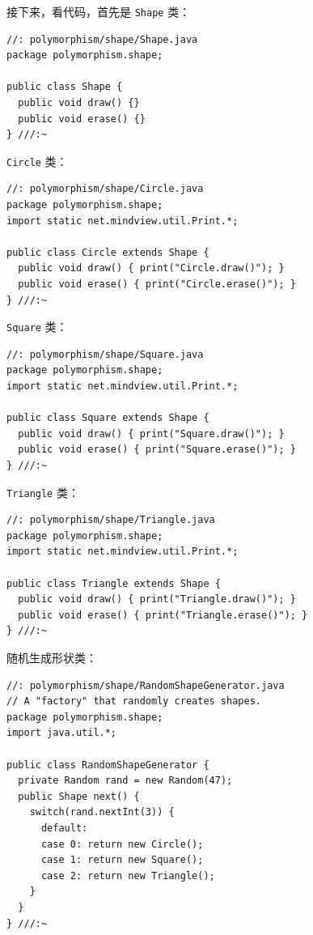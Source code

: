 \documentclass[10pt,a4paper,UTF8]{article}
\begin{document}
接下来，看代码，首先是 \texttt{Shape} 类：
\lstset{language=java,label= ,caption= ,captionpos=b,firstnumber=1,numbers=left}
\begin{lstlisting}
//: polymorphism/shape/Shape.java
package polymorphism.shape;

public class Shape {
  public void draw() {}
  public void erase() {}
} ///:~
\end{lstlisting}
\texttt{Circle} 类：
\lstset{language=java,label= ,caption= ,captionpos=b,firstnumber=1,numbers=left}
\begin{lstlisting}
//: polymorphism/shape/Circle.java
package polymorphism.shape;
import static net.mindview.util.Print.*;

public class Circle extends Shape {
  public void draw() { print("Circle.draw()"); }
  public void erase() { print("Circle.erase()"); }
} ///:~
\end{lstlisting}
\texttt{Square} 类：
\lstset{language=java,label= ,caption= ,captionpos=b,firstnumber=1,numbers=left}
\begin{lstlisting}
//: polymorphism/shape/Square.java
package polymorphism.shape;
import static net.mindview.util.Print.*;

public class Square extends Shape {
  public void draw() { print("Square.draw()"); }
  public void erase() { print("Square.erase()"); }
} ///:~
\end{lstlisting}
\texttt{Triangle} 类：
\lstset{language=java,label= ,caption= ,captionpos=b,firstnumber=1,numbers=left}
\begin{lstlisting}
//: polymorphism/shape/Triangle.java
package polymorphism.shape;
import static net.mindview.util.Print.*;

public class Triangle extends Shape {
  public void draw() { print("Triangle.draw()"); }
  public void erase() { print("Triangle.erase()"); }
} ///:~
\end{lstlisting}
随机生成形状类：
\lstset{language=java,label= ,caption= ,captionpos=b,firstnumber=1,numbers=left}
\begin{lstlisting}
//: polymorphism/shape/RandomShapeGenerator.java
// A "factory" that randomly creates shapes.
package polymorphism.shape;
import java.util.*;

public class RandomShapeGenerator {
  private Random rand = new Random(47);
  public Shape next() {
    switch(rand.nextInt(3)) {
      default:
      case 0: return new Circle();
      case 1: return new Square();
      case 2: return new Triangle();
    }
  }
} ///:~
\end{lstlisting}
\end{document}
